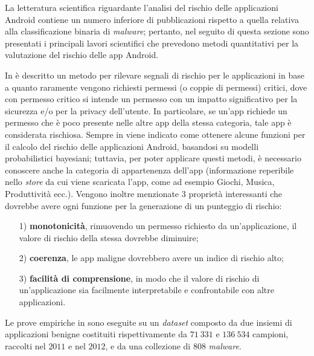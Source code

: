 \documentclass[12pt,a4paper,oneside]{article}
\begin{document}
La letteratura scientifica riguardante l'analisi del rischio delle applicazioni Android contiene un numero inferiore di pubblicazioni rispetto a quella relativa alla classificazione binaria di \textit{malware}; pertanto, nel seguito di questa sezione sono presentati i principali lavori scientifici che prevedono metodi quantitativi per la valutazione del rischio delle app Android.
\newline

In \cite{ROTARU} è descritto un metodo per rilevare segnali di rischio per le applicazioni in base a quanto raramente vengono richiesti permessi (o coppie di permessi) critici, dove con permesso critico si intende un permesso con un impatto significativo per la sicurezza e/o per la privacy dell'utente. In particolare, se un'app richiede un permesso che è poco presente nelle altre app della stessa categoria, tale app è considerata rischiosa. Sempre in \cite{ROTARU} viene indicato come ottenere alcune funzioni per il calcolo del rischio delle applicazioni Android, basandosi su modelli probabilistici bayesiani; tuttavia, per poter applicare questi metodi, è necessario conoscere anche la categoria di appartenenza dell'app (informazione reperibile nello \textit{store} da cui viene scaricata l'app, come ad esempio Giochi, Musica, Produttività ecc.). Vengono inoltre menzionate $3$ proprietà interessanti che dovrebbe avere ogni funzione per la generazione di un punteggio di rischio:
\begin{enumerate}
    \item[1)]\textbf{monotonicità}, rimuovendo un permesso richiesto da un'applicazione, il valore di rischio della stessa dovrebbe diminuire;
    \item[2)]\textbf{coerenza}, le app maligne dovrebbero avere un indice di rischio alto;
    \item[3)]\textbf{facilità di comprensione}, in modo che il valore di rischio di un'applicazione sia facilmente interpretabile e confrontabile con altre applicazioni.
\end{enumerate}
Le prove empiriche in \cite{ROTARU} sono eseguite su un \textit{dataset} composto da due insiemi di applicazioni benigne costituiti rispettivamente da $71~331$ e $136~534$ campioni, raccolti nel $2011$ e nel $2012$, e da una collezione di $808$ \textit{malware}.
\newline
\end{document}
